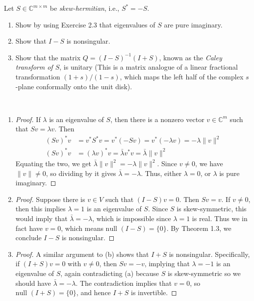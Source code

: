 \documentclass[12pt]{article}
\newenvironment{ex}[2][Exercise]{\begin{trivlist}
		\item[\hskip \labelsep {\bfseries #1}\hskip \labelsep {\bfseries #2.}]}{\end{trivlist}}
\newenvironment{sol}[1][Solution]{\begin{trivlist}
		\item[\hskip \labelsep {\bfseries #1:}]}{\end{trivlist}}
\begin{document}
\begin{ex}{5}
	Let $S\in\mathbb{C}^{m\times m}$ be \emph{skew-hermitian}, i.e., $S^*=-S$.
	\begin{enumerate}[label=(\alph*)]
		\item Show by using Exercise 2.3 that eigenvalues of $S$ are pure imaginary.
		\item Show that $I-S$ is nonsingular.
		\item Show that the matrix $Q=(I-S)^{-1}(I+S)$, known as the \emph{Caley transform of $S$},
		is unitary (This is a matrix analogue of a linear fractional transformation $(1+s)/(1-s)$,
		which maps the left half of the complex $s$-plane conformally onto the unit disk).
	\end{enumerate}
\end{ex}

\begin{sol}
	\
	\begin{enumerate}[label=(\alph*)]
		\item \begin{proof}
			If $\lambda$ is an eigenvalue of $S$, then there is a nonzero vector $v\in\mathbb{C}^m$ such that $Sv=\lambda v$. Then
			\begin{align*}
				(Sv)^*v &= v^*S^*v = v^* (-Sv) = v^*(-\lambda v) = -\lambda \lVert v\rVert^2\\
				(Sv)^*v &= (\lambda v)^*v = \bar{\lambda} v^*v = \bar{\lambda}\lVert v\rVert^2
			\end{align*}
			Equating the two, we get $\bar{\lambda}\lVert v\rVert^2 = -\lambda \lVert v\rVert^2$.
			Since $v\neq 0$, we have $\lVert v\rVert\neq 0$, so dividing by it gives $\bar{\lambda}=-\lambda$.
			Thus, either $\lambda=0$, or $\lambda$ is pure imaginary.
		\end{proof}
		\item \begin{proof}
			Suppose there is $v\in V$ such that $(I-S)v=0$. Then $Sv=v$. If $v\neq 0$, then this implies
			$\lambda=1$ is an eigenvalue of $S$. Since $S$ is skew-symmetric, this would imply that
			$\bar{\lambda}=-\lambda$, which is impossible since $\lambda=1$ is real. Thus we in fact
			have $v=0$, which means $\text{null }(I-S)=\{0\}$. By Theorem 1.3, we conclude $I-S$ is
			nonsingular.
		\end{proof}
		\item \begin{proof}
			A similar argument to (b) shows that $I+S$ is nonsingular. Specifically,
			if $(I+S)v=0$ with $v\neq 0$, then $Sv=-v$, implying that $\lambda=-1$
			is an eigenvalue of $S$, again contradicting (a) because $S$ is skew-symmetric
			so we should have $\bar{\lambda}=-\lambda$. The contradiction implies that
			$v=0$, so $\text{null }(I+S)=\{0\}$, and hence $I+S$ is invertible.
			

\end{proof}
\end{enumerate}
\end{sol}
\end{document}
